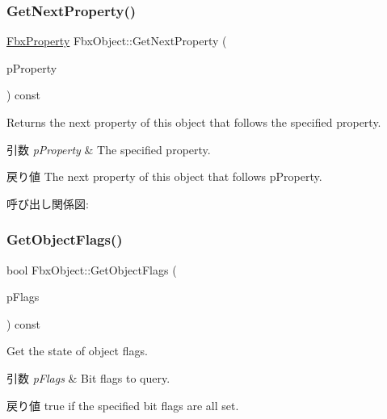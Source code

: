 \subsubsection{\texorpdfstring{Get\+Next\+Property()}{GetNextProperty()}}
{\footnotesize\ttfamily \hyperlink{class_fbx_property}{Fbx\+Property} Fbx\+Object\+::\+Get\+Next\+Property (\begin{DoxyParamCaption}\item[{const \hyperlink{class_fbx_property}{Fbx\+Property} \&}]{p\+Property }\end{DoxyParamCaption}) const}

Returns the next property of this object that follows the specified property. 
\begin{DoxyParams}{引数}
{\em p\+Property} & The specified property. \\
\hline
\end{DoxyParams}
\begin{DoxyReturn}{戻り値}
The next property of this object that follows p\+Property. 
\end{DoxyReturn}
呼び出し関係図\+:
\mbox{\label{class_fbx_object_a02d91c1f2930a03cfd0e8c2b1fffa0ee}} 
\subsubsection{\texorpdfstring{Get\+Object\+Flags()}{GetObjectFlags()}}
{\footnotesize\ttfamily bool Fbx\+Object\+::\+Get\+Object\+Flags (\begin{DoxyParamCaption}\item[{\hyperlink{class_fbx_object_a117b8002963e9fe475a93556c217b244}{E\+Object\+Flag}}]{p\+Flags }\end{DoxyParamCaption}) const}

Get the state of object flags. 
\begin{DoxyParams}{引数}
{\em p\+Flags} & Bit flags to query. \\
\hline
\end{DoxyParams}
\begin{DoxyReturn}{戻り値}
{\ttfamily true} if the specified bit flags are all set. 
\end{DoxyReturn}
\mbox{\label{class_fbx_object_a858b87f791a3440fb9c24d3b4593935d}} 
